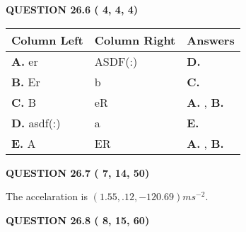 \documentclass[12pt]{article}
\begin{document}
 
 
  
\vspace{0.2in}
  
{\textbf{\Large{QUESTION
26.6 
 (          4,          4,          4)
}}}
  
  
 
 
\noindent{}
  
  
\begin{tabular}{|l|l|l|}
 \hline
 Column Left & Column Right  & Answers       \\ 
 \hline
{\textbf{\large{
A.}}}
er
  & 
ASDF(:)
 & 
{\textbf{\large{
D.}}}
 \\ 
 \hline
{\textbf{\large{
B.}}}
Er
  & 
b
 & 
{\textbf{\large{
C.}}}
 \\ 
 \hline
{\textbf{\large{
C.}}}
B
  & 
eR
 & 
{\textbf{\large{
A.}}}
, 
{\textbf{\large{
B.}}}
 \\ 
 \hline
{\textbf{\large{
D.}}}
asdf(:)
  & 
a
 & 
{\textbf{\large{
E.}}}
 \\ 
 \hline
{\textbf{\large{
E.}}}
A
  & 
ER
 & 
{\textbf{\large{
A.}}}
, 
{\textbf{\large{
B.}}}
 \\ 
 \hline
 \end{tabular}
  
  
 
 
 
 
  
\vspace{0.2in}
  
{\textbf{\Large{QUESTION
26.7 
 (          7,         14,         50)
}}}
  
  
 
 
\noindent{}
 
 
  The accelaration is $  %
(
1.55,
.12,
-120.69)
ms^{-2} $.
 
 
 
 
  
\vspace{0.2in}
  
{\textbf{\Large{QUESTION
26.8 
 (          8,         15,         60)
}}}
  
  
 
 
\noindent{}
\end{document}
